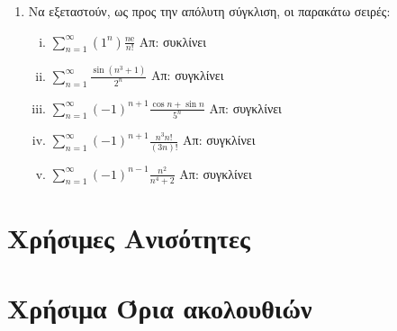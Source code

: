 \begin{enumerate}
  \item Να εξεταστούν, ως προς την απόλυτη σύγκλιση, οι παρακάτω σειρές: 

    \begin{enumerate}[i)]
      \item $ \sum_{n=1}^{\infty} (1^{n}) \frac{n \mathrm{e}}{n!} $ 
        \hfill Απ: συκλίνει
      \item $ \sum_{n=1}^{\infty} \frac{\sin{(n^{3}+1)}}{2^{n}} $ \hfill Απ: συγκλίνει 
      \item $ \sum_{n=1}^{\infty} (-1)^{n+1} \frac{\cos{n} + \sin{n}}{5^{n}} $ 
        \hfill Απ: συγκλίνει 
      \item $ \sum_{n=1}^{\infty} (-1)^{n+1} \frac{n^{3}n!}{(3n)!} $ 
        \hfill Απ: συγκλίνει 
      \item $ \sum_{n=1}^{\infty} (-1)^{n-1} \frac{n^{2}}{n^{4}+2} $ 
        \hfill Απ: συγκλίνει 
    \end{enumerate}
\end{enumerate}

\section*{Χρήσιμες Ανισότητες}



\section*{Χρήσιμα Όρια ακολουθιών}

